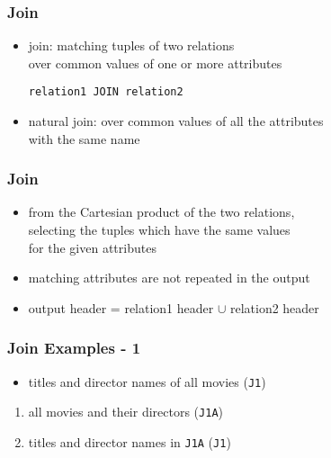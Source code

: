 \documentclass[dvipsnames]{beamer}
\theoremstyle{plain}
\begin{document}
\begin{frame}[fragile]
  \frametitle{Join}

  \begin{itemize}
    \item \alert{join}: matching tuples of two relations\\
      over common values of one or more attributes
    \begin{lstlisting}
relation1 JOIN relation2
    \end{lstlisting}

    \pause
    \medskip
    \item \alert{natural join}: over common values of all the attributes\\
      with the same name
  \end{itemize}
\end{frame}

\begin{frame}
  \frametitle{Join}

  \begin{itemize}
    \item from the Cartesian product of the two relations,\\
      selecting the tuples which have the same values\\
      for the given attributes
    \item matching attributes are not repeated in the output

    \medskip
    \item output header = relation1 header $\cup$ relation2 header
  \end{itemize}
\end{frame}

\begin{frame}
  \frametitle{Join Examples - 1}

  \begin{itemize}
    \item titles and director names of all movies
      (\texttt{J1})
  \end{itemize}

  \pause
  \begin{enumerate}
    \item all movies and their directors (\texttt{J1A})
    \item titles and director names in \texttt{J1A} (\texttt{J1})
  \end{enumerate}
\end{frame}
\end{document}
